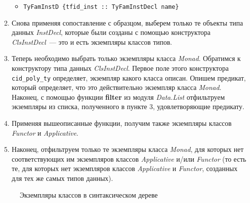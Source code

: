 \begin{enumerate}
\begin{itemize}
        \item \lstinline!TyFamInstD {tfid_inst :: TyFamInstDecl name}!
    \end{itemize}
\item Снова применяя сопоставление с образцом, выберем только те объекты типа данных \textit{InstDecl}, которые были созданы с помощью конструктора \textit{ClsInstDecl}~--- это и есть экземпляры классов типов.
\item Теперь необходимо выбрать только экземпляры класса \textit{Monad}. Обратимся к конструктору типа данных \textit{ClsInstDecl}. Первое поле этого конструктора \lstinline{cid_poly_ty} определяет, экземпляр какого класса описан. Опишем предикат, который определяет, что это действительно экземпляр класса \textit{Monad}. Наконец, с помощью функции \textbf{filter} из модуля \textit{Data.List} отфильтруем экземпляры из списка, полученного в пункте 3, удовлетворяющие предикату.
\item Применяя вышеописанные функции, получим также экземпляры классов \textit{Functor} и \textit{Applicative}.
\item Наконец, отфильтруем только те экземпляры класса \textit{Monad}, для которых нет соответствующих им экземпляров классов \textit{Applicative} и/или \textit{Functor} (то есть те, для которых нет экземпляров классов \textit{Applicative} и \textit{Functor}, созданных для тех же самых типов данных).
\end{enumerate}

\begin{figure}[h]
\caption{Экземпляры классов в синтаксическом дереве}\label{filter}
\end{figure}
\newpage

